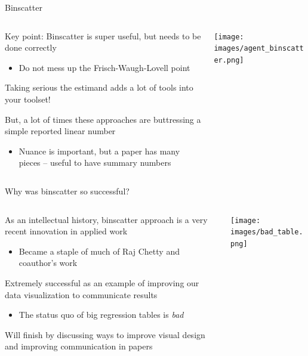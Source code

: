 \documentclass[notes,11pt, aspectratio=169]{beamer}
\newenvironment{wideitemize}{\itemize\addtolength{\itemsep}{10pt}}{\enditemize}
\begin{document}
\begin{frame}{Binscatter}
  \begin{columns}[T] %
    \begin{column}{.5\textwidth}
      \begin{wideitemize}
      \item Key point: Binscatter is super useful, but needs to be done correctly
        \begin{itemize}
        \item Do not mess up the Frisch-Waugh-Lovell point
        \end{itemize}
      \item Taking serious the estimand adds a lot of tools into your toolset!
      \item But, a lot of times these approaches are buttressing a
        simple reported linear number
        \begin{itemize}
        \item Nuance is important, but a paper has many pieces --
          useful to have summary numbers
        \end{itemize}
  \end{wideitemize}
  \end{column}%
  \hfill%
  \begin{column}{.5\textwidth}
      \texttt{[image: images/agent\_binscatter.png]}
  \end{column}
\end{columns}
\end{frame}


\begin{frame}{Why was binscatter so successful?}
  \begin{columns}[T] %
    \begin{column}{.7\textwidth}
      \begin{wideitemize}
      \item As an intellectual history, binscatter approach is a very
        recent innovation in applied work
        \begin{itemize}
        \item Became a staple of much of Raj Chetty and coauthor's work
        \end{itemize}
      \item Extremely successful as an example of improving our data
        visualization to communicate results
        \begin{itemize}
        \item The status quo of big regression tables is \emph{bad}
        \end{itemize}
      \item Will finish by discussing ways to improve visual design
        and improving communication in papers
  \end{wideitemize}
  \end{column}%
  \hfill%
  \begin{column}{.3\textwidth}
          \texttt{[image: images/bad\_table.png]}
  \end{column}
\end{columns}
\end{frame}
\end{document}

